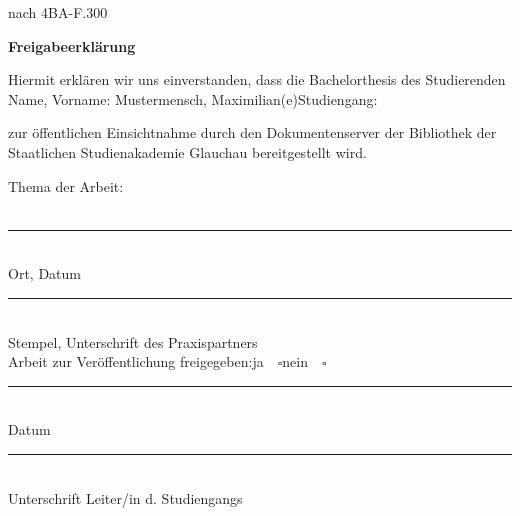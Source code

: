 


\rofoot{}
\rohead{}
    \begin{flushright}
        {\small nach 4BA-F.300\\}
    \end{flushright}
    \begin{center}
        \Large\textbf{Freigabeerklärung}\\
    \end{center}
    \normalsize

    Hiermit erklären wir uns
    einverstanden, dass die Bachelorthesis des Studierenden\\

    Name, Vorname: Mustermensch, Maximilian(e)\hfill Studiengang: \studiengang

    zur öffentlichen Einsichtnahme durch den Dokumentenserver der Bibliothek der Staatlichen Studienakademie Glauchau bereitgestellt wird.

    Thema der Arbeit:\\

    \large\titel\\\normalsize

    \noindent\rule{0.3\columnwidth}{0.4pt}\\
    Ort, Datum

    \vspace*{2cm}
    \noindent\rule{0.5\columnwidth}{0.4pt}\\
    Stempel, Unterschrift des Praxispartners\\

    Arbeit zur Veröffentlichung freigegeben:\hfill ja$\quad\square$\hfill nein$\quad\square$

    \vfill
    \begin{minipage}{0.5\columnwidth}
        \noindent\rule{0.5\columnwidth}{0.4pt}\\
        Datum
    \end{minipage}
    \begin{minipage}{0.45\columnwidth}
        \noindent\rule{0.8\columnwidth}{0.4pt}\\
        Unterschrift Leiter/in d. Studiengangs
    \end{minipage}

